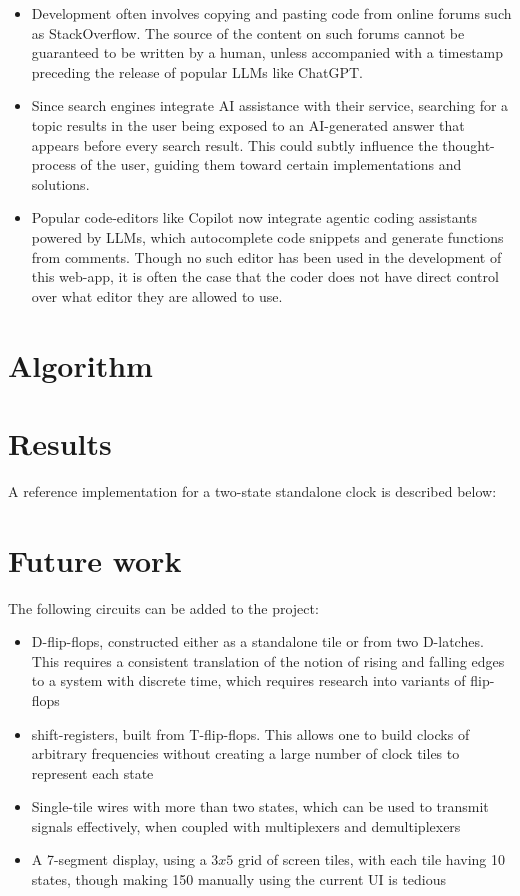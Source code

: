 \documentclass[letterpaper,11pt]{article}
\begin{document}
\begin{itemize}
	\item Development often involves copying and pasting code from online forums such as StackOverflow. The source of the content on such forums cannot be guaranteed to be written by a human, unless accompanied with a timestamp preceding the release of popular LLMs like ChatGPT.
	\item Since search engines integrate AI assistance with their service, searching for a topic results in the user being exposed to an AI-generated answer that appears before every search result. This could subtly influence the thought-process of the user, guiding them toward certain implementations and solutions.
	\item Popular code-editors like Copilot now integrate agentic coding assistants powered by LLMs, which autocomplete code snippets and generate functions from comments. Though no such editor has been used in the development of this web-app, it is often the case that the coder does not have direct control over what editor they are allowed to use.
\end{itemize}

\section*{Algorithm}

\section*{Results}

A reference implementation for a two-state standalone clock is described below:

\section*{Future work}

The following circuits can be added to the project:

\begin{itemize}
	\item D-flip-flops, constructed either as a standalone tile or from two D-latches. This requires a consistent translation of the notion of rising and falling edges to a system with discrete time, which requires research into variants of flip-flops
	\item shift-registers, built from T-flip-flops. This allows one to build clocks of arbitrary frequencies without creating a large number of clock tiles to represent each state
	\item Single-tile wires with more than two states, which can be used to transmit signals effectively, when coupled with multiplexers and demultiplexers
	\item A 7-segment display, using a $3 x 5$ grid of screen tiles, with each tile having 10 states, though making 150 manually using the current UI is tedious
\end{itemize}
\end{document}
